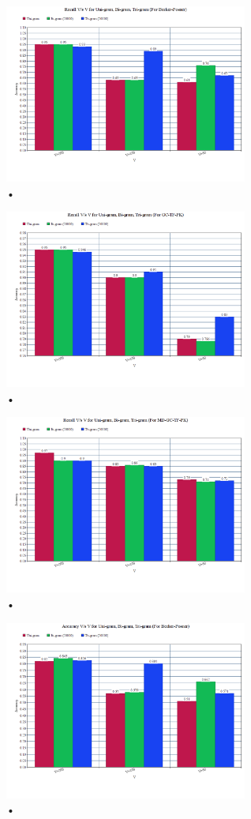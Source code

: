 \documentclass[letterpaper]{article}
\begin{document}
\begin{figure}
\caption{•}
\includegraphics[width=8cm]{1.png}
\end{figure}
\begin{figure}
\caption{•}
\includegraphics[width=8cm]{2.png}
\end{figure}
\begin{figure}
\caption{•}
\includegraphics[width=8cm]{3.png}
\end{figure}
\begin{figure}
\caption{•}
\includegraphics[width=8cm]{4.png}
\end{figure}
\end{document}
